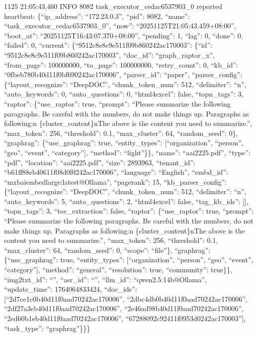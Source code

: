 \documentclass[letterpaper,10pt,english]{sphinxmanual}
\begin{document}
\sphinxhyphen{}11\sphinxhyphen{}25 21:05:43,460 INFO     8082 task\_executor\_cedac6537903\_0 reported heartbeat: \{“ip\_address”: “172.23.0.3”, “pid”: 8082, “name”: “task\_executor\_cedac6537903\_0”, “now”: “2025\sphinxhyphen{}11\sphinxhyphen{}25T21:05:43.459+08:00”, “boot\_at”: “2025\sphinxhyphen{}11\sphinxhyphen{}25T16:43:07.370+08:00”, “pending”: 1, “lag”: 0, “done”: 0, “failed”: 0, “current”: \{“9512c8e8c9e511f09b860242ac170003”: \{“id”: “9512c8e8c9e511f09b860242ac170003”, “doc\_id”: “graph\_raptor\_x”, “from\_page”: 100000000, “to\_page”: 100000000, “retry\_count”: 0, “kb\_id”: “0fbeb780b40d11f0bf690242ac170006”, “parser\_id”: “paper”, “parser\_config”: \{“layout\_recognize”: “DeepDOC”, “chunk\_token\_num”: 512, “delimiter”: “n”, “auto\_keywords”: 0, “auto\_questions”: 0, “html4excel”: false, “topn\_tags”: 3, “raptor”: \{“use\_raptor”: true, “prompt”: “Please summarize the following paragraphs. Be careful with the numbers, do not make things up. Paragraphs as following:n      \{cluster\_content\}nThe above is the content you need to summarize.”, “max\_token”: 256, “threshold”: 0.1, “max\_cluster”: 64, “random\_seed”: 0\}, “graphrag”: \{“use\_graphrag”: true, “entity\_types”: {[}“organization”, “person”, “geo”, “event”, “category”{]}, “method”: “light”\}\}, “name”: “aai2225.pdf”, “type”: “pdf”, “location”: “aai2225.pdf”, “size”: 2893963, “tenant\_id”: “b61ff88eb40611f08d0f0242ac170006”, “language”: “English”, “embd\_id”: “mxbai\sphinxhyphen{}embed\sphinxhyphen{}large:latest@Ollama”, “pagerank”: 15, “kb\_parser\_config”: \{“layout\_recognize”: “DeepDOC”, “chunk\_token\_num”: 512, “delimiter”: “n”, “auto\_keywords”: 5, “auto\_questions”: 2, “html4excel”: false, “tag\_kb\_ids”: {[}{]}, “topn\_tags”: 3, “toc\_extraction”: false, “raptor”: \{“use\_raptor”: true, “prompt”: “Please summarize the following paragraphs. Be careful with the numbers, do not make things up. Paragraphs as following:n      \{cluster\_content\}nThe above is the content you need to summarize.”, “max\_token”: 256, “threshold”: 0.1, “max\_cluster”: 64, “random\_seed”: 0, “scope”: “file”\}, “graphrag”: \{“use\_graphrag”: true, “entity\_types”: {[}“organization”, “person”, “geo”, “event”, “category”{]}, “method”: “general”, “resolution”: true, “community”: true\}\}, “img2txt\_id”: “”, “asr\_id”: “”, “llm\_id”: “qwen2.5:14b@Ollama”, “update\_time”: 1764064833424, “doc\_ids”: {[}“2d7ce1c0b40d11f0aad70242ac170006”, “2dbc4db0b40d11f0aad70242ac170006”, “2df27a3eb40d11f0aad70242ac170006”, “2e46ad98b40d11f0aad70242ac170006”, “2ed60b1eb40d11f0aad70242ac170006”, “67288092c92411f0953d0242ac170003”{]}, “task\_type”: “graphrag”\}\}\}
\end{document}
